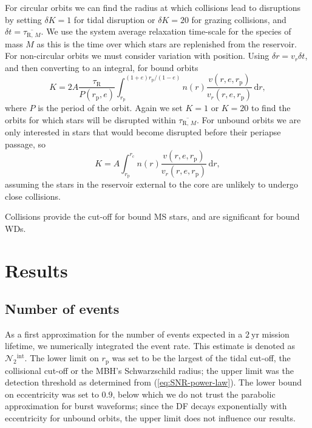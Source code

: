 \documentclass[useAMS,usedcolumn,usegraphicx,usenatbib]{mn2e}
\newcommand{\eqnref}[1]{(\ref{eq:#1})}
\newcommand{\units}[1]{\ensuremath{~\mathrm{#1}}}
\newcommand{\sub}[1]{\ensuremath{_\mathrm{#1}}}
\newcommand{\super}[1]{\ensuremath{^\mathrm{#1}}}
\newcommand{\dd}{\ensuremath{\mathrm{d}}}
\newcommand{\intd}[4]{\ensuremath{\displaystyle \int_{#1}^{#2}{#3}\,\dd{#4}}}
\begin{document}
For circular orbits we can find the radius at which collisions lead to disruptions by setting $\delta K = 1$ for tidal disruption or $\delta K = 20$ for grazing collisions, and $\delta t = \overline{\tau_{\mathrm{R},\,M}}$. We use the system average relaxation time-scale for the species of mass $M$ as this is the time over which stars are replenished from the reservoir. For non-circular orbits we must consider variation with position. Using $\delta r = v_r \delta t$, and then converting to an integral, for bound orbits
\begin{equation}
K = 2 A \frac{\tau\sub{R}}{P(r\sub{p},e)}\intd{r\sub{p}}{(1+e)r\sub{p}/(1-e)}{n(r)\frac{v(r,e,r\sub{p})}{v_r(r,e,r\sub{p})}}{r},
\end{equation}
where $P$ is the period of the orbit. Again we set $K = 1$ or $K = 20$ to find the orbits for which stars will be disrupted within $\overline{\tau_{\mathrm{R},\,M}}$. For unbound orbits we are only interested in stars that would become disrupted before their periapse passage, so
\begin{equation}
K = A \intd{r\sub{p}}{r\sub{c}}{n(r)\frac{v(r,e,r\sub{p})}{v_r(r,e,r\sub{p})}}{r},
\end{equation}
assuming the stars in the reservoir external to the core are unlikely to undergo close collisions.

Collisions provide the cut-off for bound MS stars, and are significant for bound WDs.

\section{Results}\label{sec:Gal-Results}

\subsection{Number of events}

As a first approximation for the number of events expected in a $2\units{yr}$ mission lifetime, we numerically integrated the event rate. This estimate is denoted as $\mathcal{N}_2\super{int}$. The lower limit on $r\sub{p}$ was set to be the largest of the tidal cut-off, the collisional cut-off or the MBH's Schwarzschild radius; the upper limit was the detection threshold as determined from \eqnref{SNR-power-law}. The lower bound on eccentricity was set to $0.9$, below which we do not trust the parabolic approximation for burst waveforms; since the DF decays exponentially with eccentricity for unbound orbits, the upper limit does not influence our results.
\end{document}
